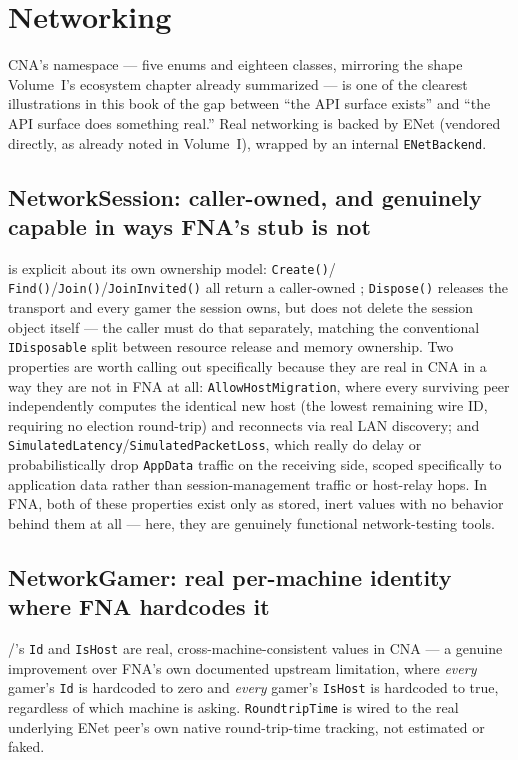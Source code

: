 \chapter{Networking}
\label{ch:networking}

CNA's  namespace --- five enums and eighteen classes,
mirroring the shape Volume~I's ecosystem chapter already summarized --- is one of the
clearest illustrations in this book of the gap between ``the API surface exists'' and ``the
API surface does something real.'' Real networking is backed by ENet (vendored directly, as
already noted in Volume~I), wrapped by an internal \texttt{ENetBackend}.

\section{NetworkSession: caller-owned, and genuinely capable in ways FNA's stub is not}

 is explicit about its own ownership model: \texttt{Create()}/%
\texttt{Find()}/\texttt{Join()}/\texttt{JoinInvited()} all return a caller-owned
; \texttt{Dispose()} releases the transport and every gamer the
session owns, but does not delete the session object itself --- the caller must do that
separately, matching the conventional \texttt{IDisposable} split between resource release and
memory ownership. Two properties are worth calling out specifically because they are real in
CNA in a way they are not in FNA at all: \texttt{AllowHostMigration}, where every surviving
peer independently computes the identical new host (the lowest remaining wire ID, requiring
no election round-trip) and reconnects via real LAN discovery; and
\texttt{SimulatedLatency}/\texttt{SimulatedPacketLoss}, which really do delay or
probabilistically drop \texttt{AppData} traffic on the receiving side, scoped specifically to
application data rather than session-management traffic or host-relay hops. In FNA, both of
these properties exist only as stored, inert values with no behavior behind them at all ---
here, they are genuinely functional network-testing tools.

\section{NetworkGamer: real per-machine identity where FNA hardcodes it}

/'s \texttt{Id} and \texttt{IsHost} are
real, cross-machine-consistent values in CNA --- a genuine improvement over FNA's own
documented upstream limitation, where \emph{every} gamer's \texttt{Id} is hardcoded to zero
and \emph{every} gamer's \texttt{IsHost} is hardcoded to true, regardless of which machine is
asking. \texttt{RoundtripTime} is wired to the real underlying ENet peer's own native
round-trip-time tracking, not estimated or faked.

